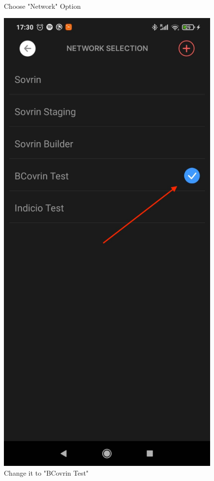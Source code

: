 \begin{figure}[!htb]
  \caption[]{Choose "Network" Option}\label{fig:trinsic_2}
\endminipage\hfill
{}%
  \includegraphics[width=\linewidth]{images/Trinsic/Trinsic_setup_network2.jpeg}
  \caption[]{Change it to "BCovrin Test"}\label{fig:trinsic_3}
\endminipage
\end{figure}


